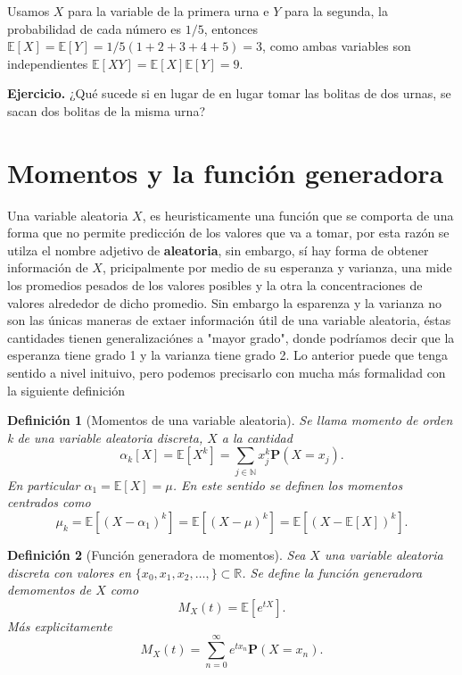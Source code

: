 \documentclass[letterpaper]{book}
\newtheorem{def.}{Definici\'on}[section]
\newcommand{\nat}{\ensuremath{ \mathbb N }}
\newcommand{\prob}{\textbf{P}}
\newcommand{\esp}{\mathbb E}
\newcommand{\eje}{{\newline \noindent \sc \textbf{Ejercicio. }}}
\newcommand{\re}{\ensuremath{\mathbb R }}
\begin{document}
\noindent Usamos \(X\) para la variable de la primera urna e \(Y\) para la segunda, la probabilidad de cada número es \(1/5\), entonces \(\esp[X]=\esp[Y]=1/5(1+2+3+4+5)=3\), como ambas variables son independientes \(\esp[XY]=\esp[X]\esp[Y]=9\).  

\eje ¿Qué sucede si en lugar de en lugar tomar las bolitas de dos urnas, se sacan dos bolitas de la misma urna?
\section{Momentos y la función generadora}
\label{sec:org1397db6}
\noindent Una variable aleatoria \(X\), es heuristicamente una función que se comporta de una forma que no permite predicción de los valores que va a tomar, por esta razón se utilza el nombre adjetivo de \textbf{aleatoria}, sin embargo, sí hay forma de obtener información de \(X\), pricipalmente por medio de su esperanza y varianza, una mide los promedios pesados de los valores posibles y la otra la concentraciones de valores alrededor de dicho promedio. Sin embargo la esparenza y la varianza no son las únicas maneras de extaer información útil de una variable aleatoria, éstas cantidades tienen generalizaciónes a "mayor grado", donde podríamos decir que la esperanza tiene grado 1 y la varianza tiene grado 2. Lo anterior puede que tenga sentido a nivel inituivo, pero podemos precisarlo con mucha más formalidad con la siguiente definición

\begin{def.}[Momentos de una variable aleatoria]
Se llama \emph{momento de orden k} de una variable aleatoria discreta, \(X\) a la cantidad
\[
\alpha_k[X]=\esp[X^k]=\sum_{j\in\nat}x_j^k\prob(X=x_j).
\]
En particular \(\alpha_1=\esp[X]=\mu\). En este sentido se definen los momentos centrados como
\[
\mu_k=\esp[(X-\alpha_1)^k]=\esp[(X-\mu)^k]=\esp[(X-\esp[X])^k].
\]
\end{def.}

\begin{def.}[Función generadora de momentos]
Sea \(X\) una variable aleatoria discreta con valores en \(\{x_0,x_1,x_2,\dots,\}\subset\re\). Se define la \emph{función generadora demomentos} de \(X\) como
\[
M_X(t)=\esp[e^{tX}].
\]
Más explicitamente
\[
M_X(t)=\sum_{n=0}^{\infty}e^{tx_n}\prob(X=x_n).
\]
\end{def.}
\end{document}
